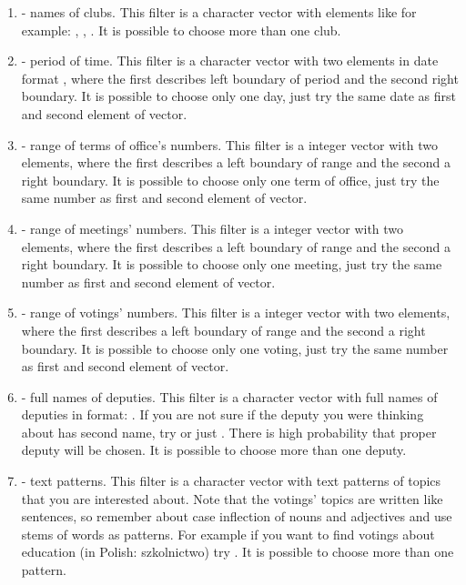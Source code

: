 \begin{enumerate}
\item {} - names of clubs. This filter is a character vector with elements like for example: , , . It is possible to choose more than one club.
\item {} - period of time. This filter is a character vector with two elements in date format , where the first describes left boundary of period and the second right boundary. It is possible to choose only one day, just try the same date as first and second element of vector.
\item {} - range of terms of office's numbers. This filter is a integer vector with two elements, where the first describes a left boundary of range and the second a right boundary. It is possible to choose only one term of office, just try the same number as first and second element of vector.
\item {} - range of meetings' numbers. This filter is a integer vector with two elements, where the first describes a left boundary of range and the second a right
boundary. It is possible to choose only one meeting, just try the same number as first and second element of vector.
\item {} - range of votings' numbers. This filter is a integer vector with two 
elements, where the first describes a left boundary of range and the second a right boundary. It is possible to choose only one voting, just try the same number as first and second element of vector.
\item {} - full names of deputies. This filter is a character vector with full names of deputies in format: . If you are not sure if the deputy you were thinking about has second name, try  or just . There is high probability that proper deputy will be chosen. 
It is possible to choose more than one deputy.
\item {} - text patterns. This filter is a character vector with text patterns of topics that you are interested about. Note that the votings' topics are written like
sentences, so remember about case inflection of nouns and adjectives and use stems of
words as patterns. For example if you want to find votings about education (in Polish:
szkolnictwo) try . It is possible to choose more than one pattern.
\end{enumerate}

